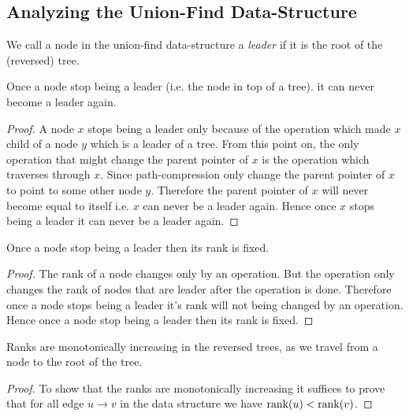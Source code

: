 \subsection{Analyzing the Union-Find Data-Structure}
We call a node in the union-find data-structure a \textit{leader} if it is the root of the (reversed) tree.
\begin{lemma}{}{}
	Once a node stop being a {leader} (i.e. the node in top of a tree). it can never become a leader again.
\end{lemma}
\begin{proof}
	A node $x$ stops being a {leader} only because of the  operation which made $x$ child of a node $y$ which is a {leader} of a tree. From this point on, the only operation that might change the parent pointer of $x$ is the  operation which traverses through $x$. Since path-compression only change the parent pointer of $x$ to point to some other node $y$. Therefore the parent pointer of $x$ will never become equal to itself i.e. $x$ can never be a {leader} again. Hence once $x$ stops being a {leader} it can never be a {leader} again.
\end{proof}
\begin{lemma}{}{}
	Once a node stop being a leader then its rank is fixed.
\end{lemma}
\begin{proof}
	The rank of a node changes only by an  operation. But the  operation only changes the rank of nodes that are {leader} after the operation is done. Therefore once a node stops being a {leader} it's rank will not being changed by an  operation. Hence once a node stop being a leader then its rank is fixed.
\end{proof}
\begin{lemma}{}{}
	Ranks are monotonically increasing in the reversed trees, as we travel from a node to
	the root of the tree.
\end{lemma}
\begin{proof}
	To show that the ranks are monotonically increasing  it suffices to prove that for all edge $u\to v$ in the data structure we have $\operatorname{rank}(u)<\operatorname{rank}(v)$. 
\end{proof}

